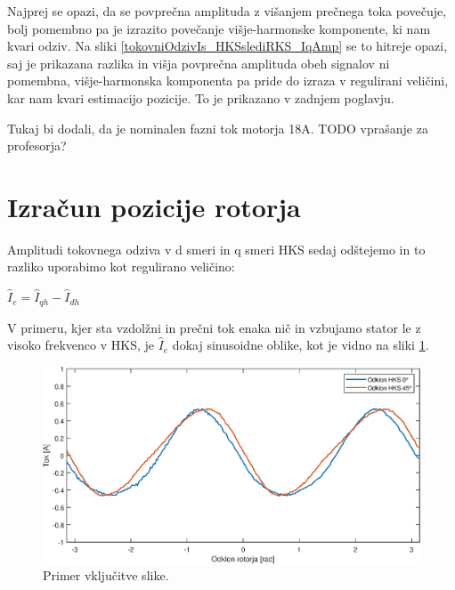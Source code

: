\documentclass[a4paper,twoside,openright,12pt,slovene]{book}
\begin{document}
Najprej se opazi, da se povprečna amplituda z višanjem prečnega toka povečuje, bolj pomembno pa je izrazito povečanje višje-harmonske komponente, ki nam kvari odziv. Na sliki
\ref{tokovniOdzivIs_HKSslediRKS_IqAmp} se to hitreje opazi, saj je prikazana razlika in višja povprečna amplituda obeh signalov ni pomembna, višje-harmonska komponenta pa pride do izraza v regulirani
veličini, kar nam kvari estimacijo pozicije. To je prikazano v zadnjem poglavju. 

Tukaj bi dodali, da je nominalen fazni tok motorja 18A. TODO vprašanje za profesorja?

%
% 
%


\section{Izračun pozicije rotorja}

Amplitudi tokovnega odziva v d smeri in q smeri HKS sedaj odštejemo in to razliko uporabimo kot regulirano veličino:

\begin{center}
    $\hat{I}_{e} = \hat{I}_{qh} - \hat{I}_{dh}$
\end{center}

V primeru, kjer sta vzdolžni in prečni tok enaka nič in vzbujamo stator le z visoko frekvenco v HKS, je $\hat{I}_{e}$ dokaj sinusoidne oblike, kot je vidno na sliki \ref{reguliranaVelicinaIdq0}.

\begin{figure}[!htbp]
    \centering
    \includegraphics[width=1\columnwidth]{Slike/reguliranaVelicinaIdq0.eps}
    \caption{\label{reguliranaVelicinaIdq0} Primer vključitve slike.}
\end{figure}
\end{document}
